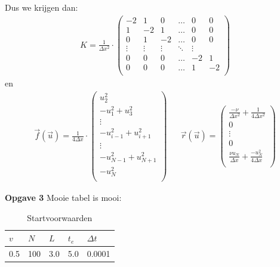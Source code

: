 \documentclass{article}
\newcommand{\Dt}{\Delta t}
\begin{document}
Dus we krijgen dan:
\begin{align*}
K = \frac{1}{\Delta x^2}\cdot\begin{pmatrix}
-2 & 1 & 0 & \hdots & 0 & 0\\
1 & -2 & 1 & \hdots & 0 & 0\\
0 & 1 & -2 & \hdots & 0 & 0\\
\vdots & \vdots & \vdots & \ddots & \vdots\\
0 & 0 & 0 & \hdots & -2 & 1\\
0 & 0 & 0 & \hdots & 1 & -2\\
\end{pmatrix}
\end{align*}
en
\begin{align*}
\vec{f}(\vec{u}) = \frac{1}{4\Delta x}\cdot
\begin{pmatrix}
u_2^2\\
-u_1^2 + u_3^2\\
\vdots\\
-u_{i-1}^2+u_{i+1}^2\\
\vdots\\
-u_{N-1}^2+u_{N+1}^2\\
-u_N^2\\
\end{pmatrix}
&&
\vec{r}(\vec{u}) = 
\begin{pmatrix}
\frac{-\nu}{\Delta x^2} + \frac{1}{4\Delta x^2}\\
0\\
\vdots\\
0\\
\frac{\nu u_N}{\Delta x} + \frac{-u_N^2}{4\Delta x}\\
\end{pmatrix}
\end{align*}

\textbf{Opgave 3}
Mooie tabel is mooi:

\begin{table}[H]
\centering
\label{tab:specs}
\begin{tabular}{|l|l|l|l|l|}
\hline
\(v\) & \(N\) & \(L\) & \(t_e\) & \(\Dt\) \\ \hline
 0.5 & 100 & 3.0 & 5.0 & 0.0001 \\ \hline
\end{tabular}
\caption{Startvoorwaarden}
\end{table}
\end{document}
